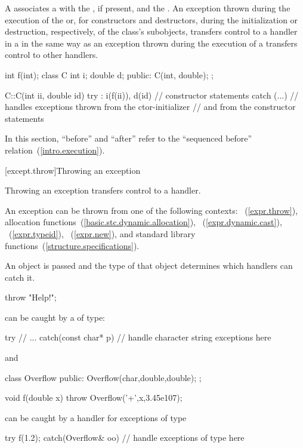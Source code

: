 \pnum
{}%
%
A
associates a
with the
,
if present, and the
.
An exception
thrown during the execution of the
or, for constructors and destructors, during the initialization or
destruction, respectively, of the class's subobjects,
transfers control to a handler in a
in the same way as an exception thrown during the execution of a
transfers control to other handlers.
\begin{example}
\begin{codeblock}
int f(int);
class C {
  int i;
  double d;
public:
  C(int, double);
};

C::C(int ii, double id)
try : i(f(ii)), d(id) {
    // constructor statements
}
catch (...) {
    // handles exceptions thrown from the ctor-initializer
    // and from the constructor statements
}

\end{codeblock}
\end{example}

\pnum
In this section, ``before'' and ``after'' refer to the
``sequenced before'' relation~(\ref{intro.execution}).

[except.throw]{Throwing an exception}%
%

\pnum
Throwing an exception transfers control to a handler.
\begin{note}
An exception can be thrown from one of the following contexts:
~(\ref{expr.throw}),
allocation functions~(\ref{basic.stc.dynamic.allocation}),
~(\ref{expr.dynamic.cast}),
~(\ref{expr.typeid}),
~(\ref{expr.new}), and standard library
functions~(\ref{structure.specifications}).
\end{note}
An object is passed and the type of that object determines which handlers
can catch it.
\begin{example}
\begin{codeblock}
throw "Help!";
\end{codeblock}
can be caught by a
of
type:
\begin{codeblock}
try {
    // ...
}
catch(const char* p) {
    // handle character string exceptions here
}
\end{codeblock}
and
\begin{codeblock}
class Overflow {
public:
    Overflow(char,double,double);
};

void f(double x) {
    throw Overflow('+',x,3.45e107);
}
\end{codeblock}
can be caught by a handler for exceptions of type
\begin{codeblock}
try {
    f(1.2);
} catch(Overflow& oo) {
    // handle exceptions of type  here
}
\end{codeblock}
\end{example}

